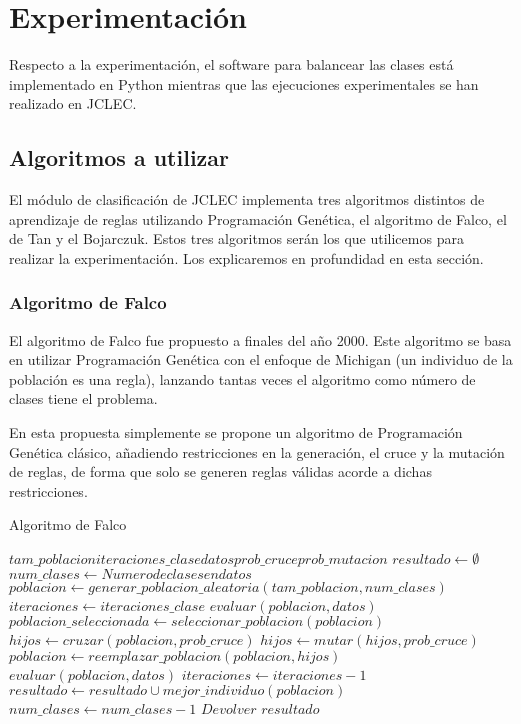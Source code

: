 \section{Experimentación}

Respecto a la experimentación, el software para balancear las clases está implementado en Python mientras que las ejecuciones experimentales se han realizado en JCLEC.


\subsection{Algoritmos a utilizar}

El módulo de clasificación de JCLEC implementa tres algoritmos distintos de aprendizaje de reglas utilizando Programación Genética, el algoritmo de Falco, el de Tan y el Bojarczuk. Estos tres algoritmos serán los que utilicemos para realizar la experimentación. Los explicaremos en profundidad en esta sección.

\subsubsection{Algoritmo de Falco}

El algoritmo de Falco \cite{algoritmoFalco} fue propuesto a finales del año 2000. Este algoritmo se basa en utilizar Programación Genética con el enfoque de Michigan (un individuo de la población es una regla), lanzando tantas veces el algoritmo como número de clases tiene el problema.

En esta propuesta simplemente se propone un algoritmo de Programación Genética clásico, añadiendo restricciones en la generación, el cruce y la mutación de reglas, de forma que solo se generen reglas válidas acorde a dichas restricciones.

\begin{algorithm}
\caption{Algoritmo de Falco}\label{alg:falco}
\begin{algorithmic}
	\Require $tam\_poblacion iteraciones\_clase datos prob\_cruce prob\_mutacion$
	\State $resultado \gets \emptyset$
	\State $num\_clases \gets Numero de clases en datos$
		\State $poblacion \gets generar\_poblacion\_aleatoria(tam\_poblacion, num\_clases)$ 
		\State $iteraciones \gets iteraciones\_clase$
		\State $evaluar(poblacion, datos)$
			\State $poblacion\_seleccionada \gets seleccionar\_poblacion(poblacion)$
			\State $hijos \gets cruzar(poblacion, prob\_cruce)$
			\State $hijos \gets mutar(hijos, prob\_cruce)$
			\State $poblacion \gets reemplazar\_poblacion(poblacion, hijos)$ 
			\State $evaluar(poblacion, datos)$
			\State $iteraciones \gets iteraciones - 1$
		\EndWhile
		\State $resultado \gets resultado \cup mejor\_individuo(poblacion)$
		\State $num\_clases \gets num\_clases - 1$
	\EndWhile
	\State $Devolver$ $resultado$
\end{algorithmic}
\end{algorithm}

